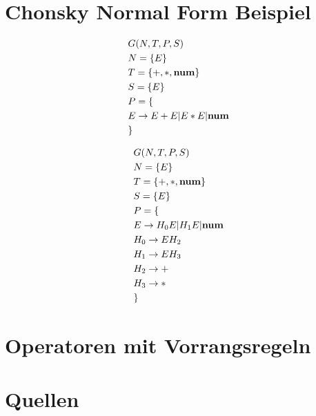 \documentclass[t]{beamer}
\begin{document}
    \section{Chonsky Normal Form Beispiel}
    \begin{frame} \cite{wharton1976}
        \begin{minipage}[c]{0.5\textwidth}
            \begin{align*}
                & G(N,T,P,S) \\
                & N= \{E\} \\
                & T= \{+, *, \bold{num}\} \\
                & S= \{E\}  \\
                & P = \{ \\
                & E \rightarrow E + E | E * E | \bold{num} \\
                & \}
            \end{align*}
        \end{minipage}\begin{minipage}[c]{0.5\textwidth}
                          \begin{align*}
                              & G(N,T,P,S) \\
                              & N= \{E\} \\
                              & T= \{+, *, \bold{num}\} \\
                              & S= \{E\}  \\
                              & P = \{ \\
                              & E \rightarrow H_0 E | H_1 E | \bold{num} \\
                              & H_0 \rightarrow E H_2 \\
                              & H_1 \rightarrow E H_3 \\
                              & H_2 \rightarrow + \\
                              & H_3 \rightarrow * \\
                              & \}
                          \end{align*}
        \end{minipage}
    \end{frame}


    \section{Operatoren mit Vorrangsregeln}
    \begin{frame}

    \end{frame}


    \section{Quellen}
    \begin{frame}[allowframebreaks]
        
        
    \end{frame}
\end{document}
